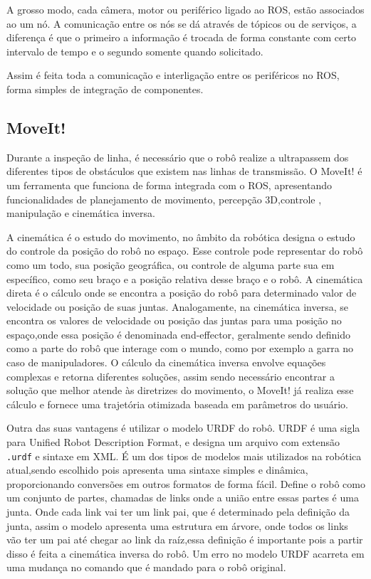 A grosso modo, cada câmera, motor ou periférico ligado ao ROS, estão associados ao um nó. A comunicação entre os nós se dá através de tópicos ou de serviços, a diferença é que o primeiro a informação é trocada de forma constante com certo intervalo de tempo e o segundo somente quando solicitado.

Assim é feita toda a comunicação e interligação entre os periféricos no ROS, forma simples de integração de componentes.

\subsection{MoveIt!}
Durante a inspeção de linha, é necessário que o robô realize a ultrapassem dos diferentes tipos de obstáculos que existem nas linhas de transmissão. O MoveIt! é um ferramenta que funciona de forma integrada com o ROS, apresentando funcionalidades de planejamento de movimento, percepção 3D,controle , manipulação e cinemática inversa. 

A cinemática é o estudo do movimento, no âmbito da robótica designa o estudo do controle da posição do robô no espaço. Esse controle pode representar do robô como um todo, sua posição geográfica, ou controle de alguma parte sua em específico, como seu braço e a posição relativa desse braço e o robô.  A cinemática direta é o cálculo onde se encontra a posição do robô para determinado valor de velocidade ou posição de suas juntas. Analogamente, na cinemática inversa, se encontra os valores de velocidade ou posição das juntas para uma posição no espaço,onde essa posição é denominada end-effector, geralmente sendo definido como a parte do robô que interage com o mundo, como por exemplo a garra no caso de manipuladores. O cálculo da cinemática inversa envolve equações complexas e retorna diferentes soluções, assim sendo necessário encontrar a solução que melhor atende às diretrizes do movimento, o MoveIt! já realiza esse cálculo e fornece uma trajetória otimizada baseada em parâmetros do usuário.

Outra das suas vantagens é utilizar o modelo URDF do robô. URDF é uma sigla para Unified Robot Description Format, e designa um arquivo com extensão \verb|.urdf| e sintaxe em XML. É um dos tipos de modelos mais utilizados na robótica atual,sendo escolhido pois apresenta uma sintaxe simples e dinâmica, proporcionando conversões em outros formatos de forma fácil. Define o robô como um conjunto de partes, chamadas de links onde a união entre essas partes é uma junta. Onde cada link vai ter um link pai, que é determinado pela definição da junta, assim o modelo apresenta uma estrutura em árvore, onde todos os links vão ter um pai até chegar ao link da raíz,essa definição é importante pois a partir disso é feita a cinemática inversa do robô. Um erro no modelo URDF acarreta em uma mudança no comando que é mandado para o robô original.

